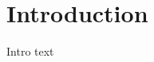 \documentclass[12pt]{article}
\newcommand*\NewPage{\newpage\null\thispagestyle{empty}\newpage}
\begin{document}
\NewPage



\setcounter{page}{1} 

\tableofcontents

\vfill
\listoffigures %

\vfill
\listoftables	%
\pagebreak





\section{Introduction}
Intro text
\end{document}
